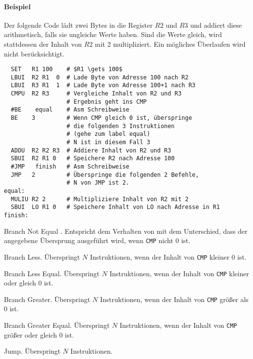 \paragraph{Beispiel}
Der folgende Code lädt zwei Bytes in die Register $R2$ und $R3$ und addiert
diese arithmetisch, falls sie ungleiche Werte haben. Sind die Werte gleich,
wird stattdessen der Inhalt von $R2$ mit 2 multipliziert. Ein mögliches
Überlaufen wird nicht berücksichtigt.
\begin{lstlisting}
  SET   R1 100    # $R1 \gets 100$
  LBUI  R2 R1  0  # Lade Byte von Adresse 100 nach R2
  LBUI  R3 R1  1  # Lade Byte von Adresse 100+1 nach R3
  CMPU  R2 R3     # Vergleiche Inhalt von R2 und R3
                  # Ergebnis geht ins CMP
  #BE    equal    # Asm Schreibweise
  BE    3         # Wenn CMP gleich 0 ist, überspringe 
                  # die folgenden 3 Instruktionen
                  # (gehe zum label equal)
                  # N ist in diesem Fall 3
  ADDU  R2 R2 R3  # Addiere Inhalt von R2 und R3
  SBUI  R2 R1 0   # Speichere R2 nach Adresse 100
  #JMP   finish   # Asm Schreibweise
  JMP   2         # Überspringe die folgenden 2 Befehle, 
                  # N von JMP ist 2.
equal:
  MULIU R2 2      # Multipliziere Inhalt von R2 mit 2
  SBUI  LO R1 0   # Speichere Inhalt von LO nach Adresse in R1
finish:
\end{lstlisting}



\glqq Branch Not Equal \grqq.
Entspricht dem Verhalten von  mit dem Unterschied, dass der angegebene
Übersprung ausgeführt wird, wenn \texttt{CMP} nicht $0$ ist.


\glqq Branch Less\grqq. 
Überspringt $N$ Instruktionen, wenn der Inhalt von \texttt{CMP} kleiner $0$ ist.


\glqq Branch Less Equal\grqq.
Überspringt $N$ Instruktionen, wenn der Inhalt von \texttt{CMP} kleiner oder
gleich $0$ ist.


\glqq Branch Greater\grqq.
Überspringt $N$ Instruktionen, wenn der Inhalt von \texttt{CMP} größer als
$0$ ist.


\glqq Branch Greater Equal\grqq. 
Überspringt $N$ Instruktionen, wenn der Inhalt von \texttt{CMP} größer oder
gleich $0$ ist.


\glqq Jump\grqq.
Überspringt $N$ Instruktionen.


